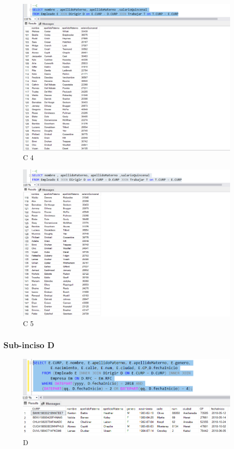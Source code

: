 \documentclass[a4paper, 12pt]{report}
\begin{document}
    \begin{figure}
        \includegraphics[width=\textwidth]
            {img/C4.png}\hfill
    \caption{C 4}
    \end{figure}
    \begin{figure}
        \includegraphics[width=\textwidth]
            {img/C5.png}\hfill
    \caption{C 5}
    \end{figure}

\subsubsection*{Sub-inciso D}
    \begin{figure}
        \includegraphics[width=\textwidth]
            {img/D.png}\hfill
    \caption{D}
    \end{figure}
\end{document}
